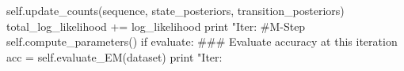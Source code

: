 \begin{exercise}
\begin{python}
                self.update_counts(sequence, state_posteriors, transition_posteriors)
                total_log_likelihood += log_likelihood
            print "Iter: %
            #M-Step
            self.compute_parameters()
            if evaluate:
                 ### Evaluate accuracy at this iteration
                acc = self.evaluate_EM(dataset)
                print "Iter: %
\end{python}

\end{exercise}

